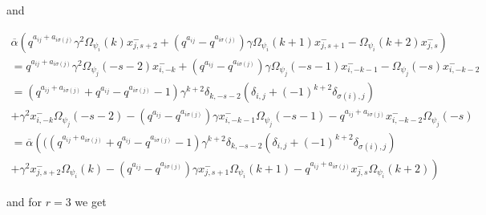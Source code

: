 \documentclass[12pt]{amsart}
\numberwithin{equation}{section}
\begin{document}
    and 

    \begin{multline*}
        \overline{\alpha}(q^{a_{ij} + a_{i\sigma(j)}}\gamma^2\Omega_{\psi_i}(k)x_{j,s+2}^- + (q^{a_{ij}} - q^{a_{i\sigma(j)}})\gamma\Omega_{\psi_i}(k+1)x_{j,s+1}^- - \Omega_{\psi_i}(k+2)x_{j,s}^-) \\
        = q^{a_{ij} + a_{i\sigma(j)}}\gamma^2\Omega_{\psi_j}(-s-2)x_{i,-k}^- + (q^{a_{ij}} - q^{a_{i\sigma(j)}})\gamma\Omega_{\psi_j}(-s-1)x_{i,-k-1}^- - \Omega_{\psi_j}(-s)x_{i,-k-2}^-\\
        =(q^{a_{ij} + a_{i\sigma(j)}} + q^{a_{ij}} - q^{a_{i\sigma(j)}} - 1)\gamma^{k+2}\delta_{k,-s-2}(\delta_{i,j} + (-1)^{k+2}\delta_{\sigma(i),j})  \\
        +\gamma^2x_{i,-k}^-\Omega_{\psi_j}(-s-2) - (q^{a_{ij}} - q^{a_{i\sigma(j)}})\gamma x_{i,-k-1}^-\Omega_{\psi_j}(-s-1) - q^{a_{ij} + a_{i\sigma(j)}}x_{i,-k-2}^-\Omega_{\psi_j}(-s)\\
        =\overline{\alpha}\left( ((q^{a_{ij} + a_{i\sigma(j)}} + q^{a_{ij}} - q^{a_{i\sigma(j)}} - 1)\gamma^{k+2}\delta_{k,-s-2}(\delta_{i,j} + (-1)^{k+2}\delta_{\sigma(i),j}) \right.\\
        \left. +\gamma^2x_{j,s+2}^-\Omega_{\psi_i}(k) - (q^{a_{ij}} - q^{a_{i\sigma(j)}})\gamma x_{j,s+1}^-\Omega_{\psi_i}(k+1) - q^{a_{ij} + a_{i\sigma(j)}}x_{j,s}^-\Omega_{\psi_i}(k+2) \right)
    \end{multline*}

    and for $r=3$ we get
\end{document}
